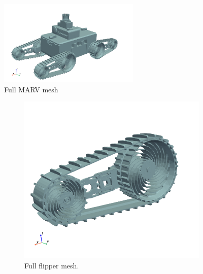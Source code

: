 \documentclass[a4paper,12pt]{article}
\begin{document}
\begin{figure}
  \centering
  \includegraphics[width=0.6\textwidth]{fig/full_marv_mesh.png}
  \caption{Full MARV mesh}
  \label{fig:full_marv_mesh}
\end{figure}

\begin{figure}[H]
  \centering
  \begin{subfigure}[t]{0.45\textwidth}
      \centering
      \includegraphics[width=\textwidth]{fig/full_flipper_mesh.png} %
      \caption{Full flipper mesh.}
      \label{fig:fig1}
  \end{subfigure}
  \hfill
  \begin{subfigure}[t]{0.45\textwidth}
      \centering

\end{subfigure}
\end{figure}
\end{document}
